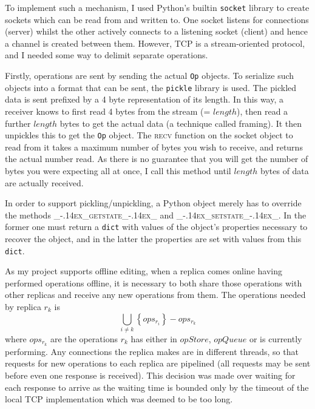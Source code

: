 \documentclass[diss.tex]{subfiles}
\begin{document}
To implement such a mechanism, I used Python's builtin \texttt{socket} library to create sockets which can be read from and written to. One socket listens for connections (server) whilst the other actively connects to a listening socket (client) and hence a channel is created between them. However, TCP is a stream-oriented protocol, and I needed some way to delimit separate operations.

Firstly, operations are sent by sending the actual \texttt{Op} objects. To serialize such objects into a format that can be sent, the \texttt{pickle} library \cite{pickle} is used. The pickled data is sent prefixed by a 4 byte representation of its length. In this way, a receiver knows to first read 4 bytes from the stream (= $length$), then read a further $length$ bytes to get the actual data (a technique called framing). It then unpickles this to get the \texttt{Op} object. The \textsc{recv} function on the socket object to read from it takes a maximum number of bytes you wish to receive, and returns the actual number read. As there is no guarantee that you will get the number of bytes you were expecting all at once, I call this method until $length$ bytes of data are actually received.

In order to support pickling/unpickling, a Python object merely has to override the methods \textsc{\_\kern-.14ex\_getstate\_\kern-.14ex\_} and \textsc{\_\kern-.14ex\_setstate\_\kern-.14ex\_}. In the former one must return a \texttt{dict} with values of the object's properties necessary to recover the object, and in the latter the properties are set with values from this \texttt{dict}.

As my project supports offline editing, when a replica comes online having performed operations offline, it is necessary to both share those operations with other replicas and receive any new operations from them. The operations needed by replica $r_k$ is $$\bigcup_{i\neq k} \left\{ops_{r_i}\right\} - ops_{r_k}$$ where $ops_{r_k}$ are the operations $r_k$ has either in $opStore$, $opQueue$ or is currently performing. Any connections the replica makes are in different threads, so that requests for new operations to each replica are pipelined (all requests may be sent before even one response is received). This decision was made over waiting for each response to arrive as the waiting time is bounded only by the timeout of the local TCP implementation which was deemed to be too long.
\end{document}
